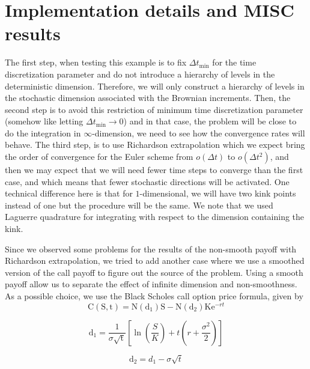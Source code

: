 \documentclass[11pt]{article}
\newcommand{\ordo}[1]{{o}\left(#1\right)}
\begin{document}
 \newpage
\section{Implementation details and  MISC results}\label{sec:Implementation details and  MISC results}
The first step, when testing this example is to fix $\Delta t_{\text{min}}$ for the  time discretization parameter and do not introduce a hierarchy of levels in the deterministic dimension. Therefore, we will only construct a hierarchy of levels in the stochastic dimension associated with the Brownian increments. Then, the second step is to avoid this restriction of minimum  time discretization parameter (somehow like letting $\Delta t_{\text{min}} \rightarrow 0$)  and in that case, the problem will be close to do the integration in $\infty$-dimension, we need to see how the convergence rates will behave. The third step, is to use Richardson extrapolation which we expect bring the order of convergence for the Euler scheme from $ \ordo{\Delta t}$  to  $\ordo{\Delta t^2}$, and then we may expect that we will need fewer time steps to converge than the first case, and which means that fewer stochastic directions will be activated.   One technical difference here is that for $1$-dimensional, we will have two kink points instead of one but the procedure will be the same.  We note that we used Laguerre quadrature for integrating with respect to the dimension containing the kink. 

Since we observed some problems for the results of the non-smooth payoff with Richardson extrapolation, we tried to add another case where we use a smoothed version of the call payoff to figure out the source of the problem. Using a smooth payoff allow us to separate the effect of infinite dimension and non-smoothness. As a possible choice, we use  the Black Scholes call option price formula, given by 
\begin{equation}
\mathrm C(\mathrm S,\mathrm t)= \mathrm N(\mathrm d_1)\mathrm S - \mathrm N(\mathrm d_2) \mathrm K \mathrm e^{-rt}
\label{eq:2}
\end{equation}

\begin{equation}
\mathrm d_1= \frac{1}{\sigma \sqrt{\mathrm t}} \left[\ln{\left(\frac{S}{K}\right)} + t\left(r + \frac{\sigma^2}{2} \right) \right]
\end{equation}

\begin{equation}
\mathrm d_2= d_1- \sigma  \sqrt{t} 
\end{equation}
\end{document}
